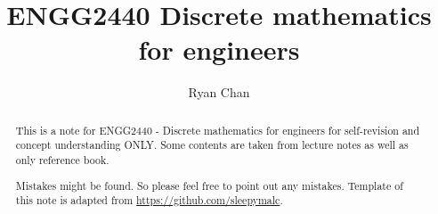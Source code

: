 \documentclass[a4paper]{report}
\author{Ryan Chan}
\title{ENGG2440 Discrete mathematics for engineers}
\begin{document}
\setlength\parindent{0pt}


\maketitle

\newpage

\begin{abstract}
	This is a note for ENGG2440 - Discrete mathematics for engineers for self-revision and concept understanding ONLY. Some contents are taken from lecture notes as well as only reference book. 
	
	Mistakes might be found. So please feel free to point out any mistakes.
	\vfill
	Template of this note is adapted from \href{https://github.com/sleepymalc}{https://github.com/sleepymalc}.
\end{abstract}

\newpage

\tableofcontents

\setlength{\parskip}{5pt}

\newpage
\appendix
\appendixpage{}



\newpage
\pagestyle{plain}
\printbibliography{}
\end{document}
